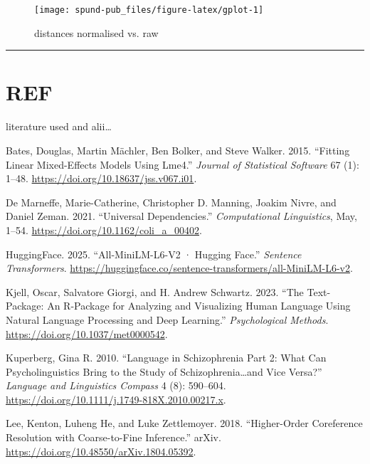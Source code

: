 \documentclass[
  12pt,
  oneside]{book}
\newlength{\cslhangindent}
\newenvironment{CSLReferences}[2] %
 {\begin{list}{}{%
  \setlength{\itemindent}{0pt}
  \setlength{\leftmargin}{0pt}
  \setlength{\parsep}{0pt}
  \ifodd #1
   \setlength{\leftmargin}{\cslhangindent}
   \setlength{\itemindent}{-1\cslhangindent}
  \fi
  \setlength{\itemsep}{#2\baselineskip}}}
 {\end{list}}
\begin{document}
\begin{figure}[H]
\texttt{[image: spund-pub\_files/figure-latex/gplot-1]} \caption{distances normalised vs. raw}\label{fig:gplot}
\end{figure}

\begin{center}\rule{0.5\linewidth}{0.5pt}\end{center}

\section{REF}\label{ref-1}

literature used and alii\ldots{}

\label{refs}
\begin{CSLReferences}{1}{0}
Bates, Douglas, Martin Mächler, Ben Bolker, and Steve Walker. 2015. {``Fitting {Linear} {Mixed}-{Effects} {Models} {Using} Lme4.''} \emph{Journal of Statistical Software} 67 (1): 1--48. \url{https://doi.org/10.18637/jss.v067.i01}.

De Marneffe, Marie-Catherine, Christopher D. Manning, Joakim Nivre, and Daniel Zeman. 2021. {``Universal {Dependencies}.''} \emph{Computational Linguistics}, May, 1--54. \url{https://doi.org/10.1162/coli_a_00402}.

HuggingFace. 2025. {``All-{MiniLM}-{L6}-V2 · {Hugging} {Face}.''} \emph{Sentence Transformers}. \url{https://huggingface.co/sentence-transformers/all-MiniLM-L6-v2}.

Kjell, Oscar, Salvatore Giorgi, and H. Andrew Schwartz. 2023. {``The Text-Package: {An} {R}-Package for {Analyzing} and {Visualizing} {Human} {Language} {Using} {Natural} {Language} {Processing} and {Deep} {Learning}.''} \emph{Psychological Methods}. \url{https://doi.org/10.1037/met0000542}.

Kuperberg, Gina R. 2010. {``Language in Schizophrenia {Part} 2: {What} Can Psycholinguistics Bring to the Study of Schizophrenia\ldots and Vice Versa?''} \emph{Language and Linguistics Compass} 4 (8): 590--604. \url{https://doi.org/10.1111/j.1749-818X.2010.00217.x}.

Lee, Kenton, Luheng He, and Luke Zettlemoyer. 2018. {``Higher-Order {Coreference} {Resolution} with {Coarse}-to-Fine {Inference}.''} arXiv. \url{https://doi.org/10.48550/arXiv.1804.05392}.


\end{CSLReferences}
\end{document}
